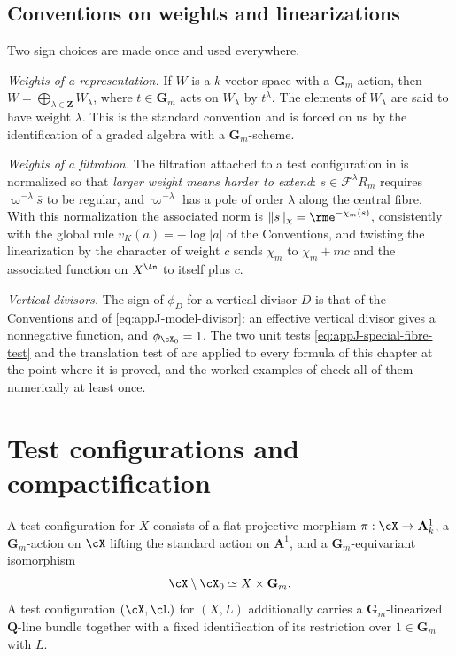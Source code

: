 \subsection{Conventions on weights and linearizations}
\label{sec:ch33-weight-conventions}

Two sign choices are made once and used everywhere.

\emph{Weights of a representation.}  If $W$ is a
$k$-vector space with a $\mathbf G_m$-action, then
$W=\bigoplus_{\lambda\in\mathbf Z}W_\lambda$, where $t\in\mathbf G_m$
acts on $W_\lambda$ by $t^\lambda$.  The elements of $W_\lambda$ are
said to have weight $\lambda$.  This is the standard convention and is
forced on us by the identification of a graded algebra with a
$\mathbf G_m$-scheme.

\emph{Weights of a filtration.}  The filtration attached to a test
configuration in  is normalized so that
\emph{larger weight means harder to extend}:
$s\in\mathcal F^\lambda R_m$ requires $\varpi^{-\lambda}\bar s$ to be
regular, and $\varpi^{-\lambda}$ has a pole of order $\lambda$ along the
central fibre.  With this normalization the associated norm is
$\lVert s\rVert_\chi=\rme^{-\chi_m(s)}$, consistently with the global rule
$v_K(a)=-\log|a|$ of the Conventions, and twisting the linearization by
the character of weight $c$ sends $\chi_m$ to $\chi_m+mc$ and the
associated function on $X^{\An}$ to itself plus $c$.

\emph{Vertical divisors.}  The sign of $\phi_D$ for a vertical divisor
$D$ is that of the Conventions and of
\eqref{eq:appJ-model-divisor}: an effective vertical divisor gives a
nonnegative function, and $\phi_{\cX_0}=1$.  The two unit tests
\eqref{eq:appJ-special-fibre-test} and the translation test of
 are applied to every formula of this chapter at the
point where it is proved, and the worked examples of
 check all of them numerically at least once.

\section{Test configurations and compactification}
\label{sec:ch33-test-configurations}

\begin{definition}
\label{def:bj-test-configuration}
A test configuration for $X$ consists of a flat projective morphism
$\pi:\cX\to\mathbf A^1_k$, a $\mathbf G_m$-action on $\cX$ lifting
the standard action on $\mathbf A^1$, and a
$\mathbf G_m$-equivariant isomorphism
\begin{equation}
\label{eq:tc-punctured-trivialization}
 \cX\setminus\cX_0\simeq X\times\mathbf G_m.
\end{equation}
A test configuration $(\cX,\cL)$ for $(X,L)$ additionally carries a
$\mathbf G_m$-linearized $\mathbf Q$-line bundle together with a fixed identification of its restriction over
$1\in\mathbf G_m$ with $L$.
\end{definition}

